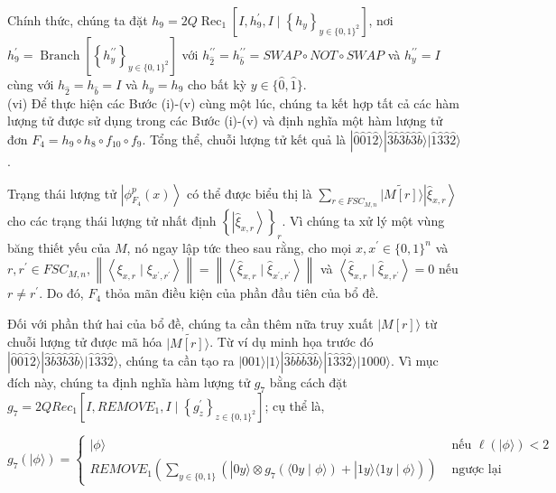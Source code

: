 \documentclass[10pt]{article}
\begin{document}
Chính thức, chúng ta đặt $h_{9}=2 Q \operatorname{Rec}_{1}\left[I, h_{9}^{\prime}, I \mid\left\{h_{y}\right\}_{y \in\{0,1\}^{2}}\right]$, nơi $h_{9}^{\prime}=\operatorname{Branch}\left[\left\{h_{y}^{\prime \prime}\right\}_{y \in\{0,1\}^{2}}\right]$ với $h_{\hat{2}}^{\prime \prime}=h_{\hat{b}}^{\prime \prime}= S W A P \circ N O T \circ S W A P$ và $h_{y}^{\prime \prime}=I$ cùng với $h_{\hat{2}}=h_{\hat{b}}=I$ và $h_{y}=h_{9}$ cho bất kỳ $y \in\{\hat{0}, \hat{1}\}$.\\
(vi) Để thực hiện các Bước (i)-(v) cùng một lúc, chúng ta kết hợp tất cả các hàm lượng tử được sử dụng trong các Bước (i)-(v) và định nghĩa một hàm lượng tử đơn $F_{4}=h_{9} \circ h_{8} \circ f_{10} \circ f_{9}$. Tổng thể, chuỗi lượng tử kết quả là $|\hat{0} \hat{0} \hat{1} \hat{2}\rangle|\hat{3} \hat{b} \hat{3} \hat{b} \hat{3} \hat{b}\rangle|\hat{1} \hat{3} \hat{3} \hat{2}\rangle$.

Trạng thái lượng tử $\left|\phi_{F_{4}}^{p}(x)\right\rangle$ có thể được biểu thị là $\sum_{r \in F S C_{M, n}}|\widetilde{M[r]}\rangle\left|\widehat{\xi}_{x, r}\right\rangle$ cho các trạng thái lượng tử nhất định $\left\{\left|\widehat{\xi}_{x, r}\right\rangle\right\}_{r}$. Vì chúng ta xử lý một vùng băng thiết yếu của $M$, nó ngay lập tức theo sau rằng, cho mọi $x, x^{\prime} \in\{0,1\}^{n}$ và $r, r^{\prime} \in F S C_{M, n},\left\|\left\langle\xi_{x, r} \mid \xi_{x^{\prime}, r^{\prime}}\right\rangle\right\|=\left\|\left\langle\widehat{\xi}_{x, r} \mid \widehat{\xi}_{x^{\prime}, r^{\prime}}\right\rangle\right\|$ và $\left\langle\hat{\xi}_{x, r} \mid \hat{\xi}_{x, r^{\prime}}\right\rangle=0$ nếu $r \neq r^{\prime}$. Do đó, $F_{4}$ thỏa mãn điều kiện của phần đầu tiên của bổ đề.

Đối với phần thứ hai của bổ đề, chúng ta cần thêm nữa truy xuất $|M[r]\rangle$ từ chuỗi lượng tử được mã hóa $\mid \widetilde{M[r]\rangle}$. Từ ví dụ minh họa trước đó $|\hat{0} \hat{0} \hat{1} \hat{2}\rangle|\hat{3} \hat{b} \hat{3} \hat{b} \hat{3} \hat{b}\rangle|\hat{1} \hat{3} \hat{3} \hat{2}\rangle$, chúng ta cần tạo ra $|001\rangle|1\rangle|\hat{3} \hat{b} \hat{b} \hat{b} \hat{3} \hat{b}\rangle|\hat{1} \hat{3} \hat{3} \hat{2}\rangle|1000\rangle$. Vì mục đích này, chúng ta định nghĩa hàm lượng tử $g_{7}$ bằng cách đặt $g_{7}=2 Q R e c_{1}\left[I, R E M O V E_{1}, I \mid\left\{g_{z}^{\prime}\right\}_{z \in\{0,1\}^{2}}\right]$; cụ thể là,

$$
g_{7}(|\phi\rangle)= \begin{cases}|\phi\rangle & \text { nếu } \ell(|\phi\rangle)<2 \\ R E M O V E_{1}\left(\sum_{y \in\{0,1\}}\left(|0 y\rangle \otimes g_{7}(\langle 0 y \mid \phi\rangle)+|1 y\rangle\langle 1 y \mid \phi\rangle\right)\right) & \text { ngược lại }\end{cases}
$$
\end{document}
